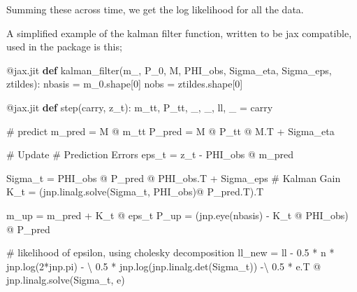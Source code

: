 \documentclass[
]{report}
\newenvironment{Shaded}{\begin{snugshade}}{\end{snugshade}}
\newcommand{\AttributeTok}[1]{\textcolor[rgb]{0.40,0.45,0.13}{#1}}
\newcommand{\CommentTok}[1]{\textcolor[rgb]{0.37,0.37,0.37}{#1}}
\newcommand{\DecValTok}[1]{\textcolor[rgb]{0.68,0.00,0.00}{#1}}
\newcommand{\FloatTok}[1]{\textcolor[rgb]{0.68,0.00,0.00}{#1}}
\newcommand{\KeywordTok}[1]{\textcolor[rgb]{0.00,0.23,0.31}{\textbf{#1}}}
\newcommand{\NormalTok}[1]{\textcolor[rgb]{0.00,0.23,0.31}{#1}}
\newcommand{\OperatorTok}[1]{\textcolor[rgb]{0.37,0.37,0.37}{#1}}
\theoremstyle{plain}
\theoremstyle{plain}
\theoremstyle{plain}
\theoremstyle{remark}
\begin{document}
Summing these across time, we get the log likelihood for all the data.

A simplified example of the kalman filter function, written to be jax
compatible, used in the package is this;

\newpage
\small

\begin{Shaded}
\begin{Highlighting}[]
\AttributeTok{@jax.jit}
\KeywordTok{def}\NormalTok{ kalman\_filter(m\_, P\_0, M, PHI\_obs, Sigma\_eta, Sigma\_eps, ztildes):}
\NormalTok{    nbasis }\OperatorTok{=}\NormalTok{ m\_0.shape[}\DecValTok{0}\NormalTok{]}
\NormalTok{    nobs }\OperatorTok{=}\NormalTok{ ztildes.shape[}\DecValTok{0}\NormalTok{]}

    \AttributeTok{@jax.jit}
    \KeywordTok{def}\NormalTok{ step(carry, z\_t):}
\NormalTok{        m\_tt, P\_tt, \_, \_, ll, \_ }\OperatorTok{=}\NormalTok{ carry}

        \CommentTok{\# predict}
\NormalTok{        m\_pred }\OperatorTok{=}\NormalTok{ M }\OperatorTok{@}\NormalTok{ m\_tt}
\NormalTok{        P\_pred }\OperatorTok{=}\NormalTok{ M }\OperatorTok{@}\NormalTok{ P\_tt }\OperatorTok{@}\NormalTok{ M.T }\OperatorTok{+}\NormalTok{ Sigma\_eta}

        \CommentTok{\# Update}
        \CommentTok{\# Prediction Errors}
\NormalTok{        eps\_t }\OperatorTok{=}\NormalTok{ z\_t }\OperatorTok{{-}}\NormalTok{ PHI\_obs }\OperatorTok{@}\NormalTok{ m\_pred}

\NormalTok{        Sigma\_t }\OperatorTok{=}\NormalTok{ PHI\_obs }\OperatorTok{@}\NormalTok{ P\_pred }\OperatorTok{@}\NormalTok{ PHI\_obs.T }\OperatorTok{+}\NormalTok{ Sigma\_eps}
        \CommentTok{\# Kalman Gain}
\NormalTok{        K\_t }\OperatorTok{=}\NormalTok{ (jnp.linalg.solve(Sigma\_t, PHI\_obs)}\OperatorTok{@}\NormalTok{ P\_pred.T).T}

\NormalTok{        m\_up }\OperatorTok{=}\NormalTok{ m\_pred }\OperatorTok{+}\NormalTok{ K\_t }\OperatorTok{@}\NormalTok{ eps\_t}
\NormalTok{        P\_up }\OperatorTok{=}\NormalTok{ (jnp.eye(nbasis) }\OperatorTok{{-}}\NormalTok{ K\_t }\OperatorTok{@}\NormalTok{ PHI\_obs) }\OperatorTok{@}\NormalTok{ P\_pred}

        \CommentTok{\# likelihood of epsilon, using cholesky decomposition}
\NormalTok{        ll\_new }\OperatorTok{=}\NormalTok{ ll }\OperatorTok{{-}} \FloatTok{0.5} \OperatorTok{*}\NormalTok{ n }\OperatorTok{*}\NormalTok{ jnp.log(}\DecValTok{2}\OperatorTok{*}\NormalTok{jnp.pi) }\OperatorTok{{-}} \OperatorTok{\textbackslash{}}
            \FloatTok{0.5} \OperatorTok{*}\NormalTok{ jnp.log(jnp.linalg.det(Sigma\_t)) }\OperatorTok{{-}\textbackslash{}}
            \FloatTok{0.5} \OperatorTok{*}\NormalTok{ e.T }\OperatorTok{@}\NormalTok{ jnp.linalg.solve(Sigma\_t, e)}


\end{Highlighting}
\end{Shaded}
\end{document}
